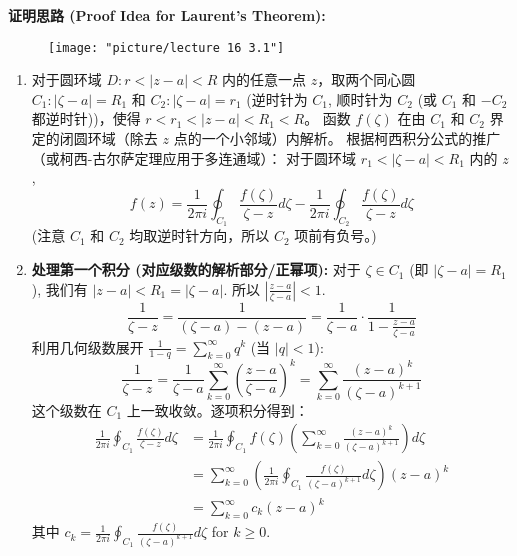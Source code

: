 \documentclass[linespread=1.5,openany]{book}%
\def\diff{d}%
\theoremstyle{plain}
\newcommand{\diff}{\mathop{}\!\mathrm{d}}  %
\begin{document}
{{{{{{{{										\textbf{证明思路 (Proof Idea for Laurent's Theorem):}
										
										\begin{figure}[h]
											\centering
											\texttt{[image: "picture/lecture 16 3.1"]}
											\caption{}
											\label{fig:lecture-16-3.1}
										\end{figure}
										
										\begin{enumerate}[label=\arabic*)]
											\item 对于圆环域 $D: r < |z-a| < R$ 内的任意一点 $z$，取两个同心圆 $C_1: |\zeta-a|=R_1$ 和 $C_2: |\zeta-a|=r_1$ (逆时针为 $C_1$, 顺时针为 $C_2$ (或 $C_1$ 和 $-C_2$ 都逆时针))，使得 $r < r_1 < |z-a| < R_1 < R$。
											函数 $f(\zeta)$ 在由 $C_1$ 和 $C_2$ 界定的闭圆环域（除去 $z$ 点的一个小邻域）内解析。
											根据柯西积分公式的推广（或柯西-古尔萨定理应用于多连通域）：
											对于圆环域 $r_1 < |\zeta-a| < R_1$ 内的 $z$,
											\begin{equation}
												f(z) = \frac{1}{2\pi i} \oint_{C_1} \frac{f(\zeta)}{\zeta-z} \diff \zeta - \frac{1}{2\pi i} \oint_{C_2} \frac{f(\zeta)}{\zeta-z} \diff \zeta 
											\end{equation}
											(注意 $C_1$ 和 $C_2$ 均取逆时针方向，所以 $C_2$ 项前有负号。)
											
											\item \textbf{处理第一个积分 (对应级数的解析部分/正幂项):}
											对于 $\zeta \in C_1$ (即 $|\zeta-a|=R_1$), 我们有 $|z-a| < R_1 = |\zeta-a|$.
											所以 $\left|\frac{z-a}{\zeta-a}\right| < 1$.
											\[ \frac{1}{\zeta-z} = \frac{1}{(\zeta-a) - (z-a)} = \frac{1}{\zeta-a} \cdot \frac{1}{1 - \frac{z-a}{\zeta-a}} \]
											利用几何级数展开 $\frac{1}{1-q} = \sum_{k=0}^\infty q^k$ (当 $|q|<1$):
											\[ \frac{1}{\zeta-z} = \frac{1}{\zeta-a} \sum_{k=0}^{\infty} \left(\frac{z-a}{\zeta-a}\right)^k = \sum_{k=0}^{\infty} \frac{(z-a)^k}{(\zeta-a)^{k+1}} \]
											这个级数在 $C_1$ 上一致收敛。逐项积分得到：
											\begin{align*}
												\frac{1}{2\pi i} \oint_{C_1} \frac{f(\zeta)}{\zeta-z} \diff \zeta &= \frac{1}{2\pi i} \oint_{C_1} f(\zeta) \left( \sum_{k=0}^{\infty} \frac{(z-a)^k}{(\zeta-a)^{k+1}} \right) \diff \zeta \\
												&= \sum_{k=0}^{\infty} \left( \frac{1}{2\pi i} \oint_{C_1} \frac{f(\zeta)}{(\zeta-a)^{k+1}} \diff \zeta \right) (z-a)^k \\
												&= \sum_{k=0}^{\infty} c_k (z-a)^k
											\end{align*}
											其中 $c_k = \frac{1}{2\pi i} \oint_{C_1} \frac{f(\zeta)}{(\zeta-a)^{k+1}} \diff \zeta$ for $k \ge 0$.
											

\end{enumerate}}}}}}}}}
\end{document}
